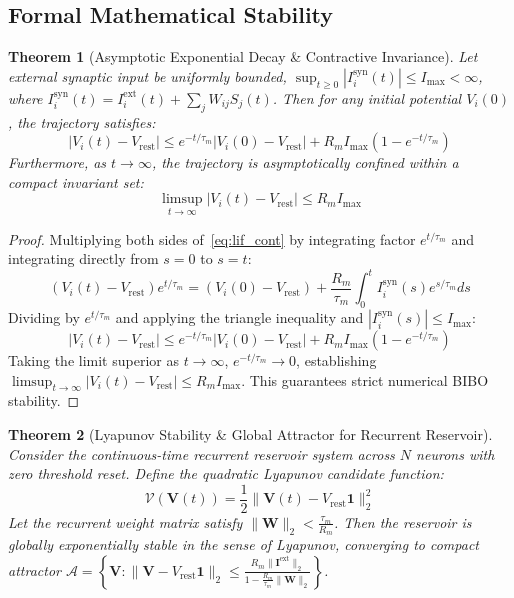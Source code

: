 \documentclass[journal,twocolumn,10pt]{article}
\newtheorem{theorem}{Theorem}
\begin{document}
\subsection{Formal Mathematical Stability}
\begin{theorem}[Asymptotic Exponential Decay \& Contractive Invariance]
\label{thm:invariance}
Let external synaptic input be uniformly bounded, $\sup_{t \ge 0} |I_i^{\text{syn}}(t)| \le I_{\max} < \infty$, where $I_i^{\text{syn}}(t) = I_i^{\text{ext}}(t) + \sum_j W_{i j} S_j(t)$. Then for any initial potential $V_i(0)$, the trajectory satisfies:
\begin{equation}
|V_i(t) - V_{\text{rest}}| \le e^{-t / \tau_m} |V_i(0) - V_{\text{rest}}| + R_m I_{\max} \left( 1 - e^{-t / \tau_m} \right)
\end{equation}
Furthermore, as $t \to \infty$, the trajectory is asymptotically confined within a compact invariant set:
\begin{equation}
\limsup_{t \to \infty} |V_i(t) - V_{\text{rest}}| \le R_m I_{\max}
\end{equation}
\end{theorem}

\begin{proof}
Multiplying both sides of~\eqref{eq:lif_cont} by integrating factor $e^{t / \tau_m}$ and integrating directly from $s = 0$ to $s = t$:
\begin{equation*}
(V_i(t) - V_{\text{rest}}) e^{t / \tau_m} = (V_i(0) - V_{\text{rest}}) + \frac{R_m}{\tau_m} \int_0^t I_i^{\text{syn}}(s) e^{s / \tau_m} d s
\end{equation*}
Dividing by $e^{t / \tau_m}$ and applying the triangle inequality and $|I_i^{\text{syn}}(s)| \le I_{\max}$:
\begin{equation*}
|V_i(t) - V_{\text{rest}}| \le e^{-t / \tau_m} |V_i(0) - V_{\text{rest}}| + R_m I_{\max} ( 1 - e^{-t / \tau_m} )
\end{equation*}
Taking the limit superior as $t \to \infty$, $e^{-t / \tau_m} \to 0$, establishing $\limsup_{t \to \infty} |V_i(t) - V_{\text{rest}}| \le R_m I_{\max}$. This guarantees strict numerical BIBO stability.
\end{proof}

\begin{theorem}[Lyapunov Stability \& Global Attractor for Recurrent Reservoir]
\label{thm:lyapunov}
Consider the continuous-time recurrent reservoir system across $N$ neurons with zero threshold reset. Define the quadratic Lyapunov candidate function:
\begin{equation}
\mathcal{V}(\mathbf{V}(t)) = \frac{1}{2} \|\mathbf{V}(t) - V_{\text{rest}} \mathbf{1}\|_2^2
\end{equation}
Let the recurrent weight matrix satisfy $\|\mathbf{W}\|_2 < \frac{\tau_m}{R_m}$. Then the reservoir is globally exponentially stable in the sense of Lyapunov, converging to compact attractor $\mathcal{A} = \left\{ \mathbf{V} : \|\mathbf{V} - V_{\text{rest}} \mathbf{1}\|_2 \le \frac{R_m \|\mathbf{I}^{\text{ext}}\|_2}{1 - \frac{R_m}{\tau_m} \|\mathbf{W}\|_2} \right\}$.
\end{theorem}
\end{document}
